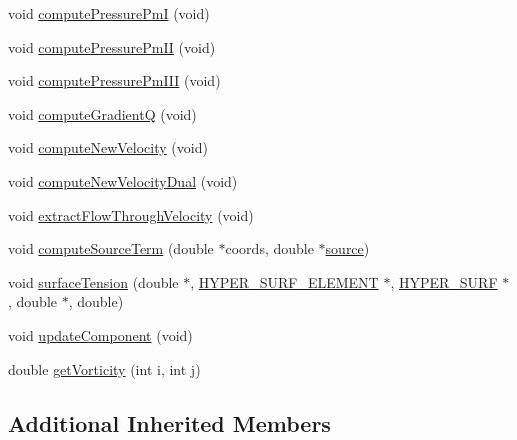 \begin{DoxyCompactItemize}
\item 
void \hyperlink{class_incompress___solver___smooth__2_d___cartesian_a04bcfa9ff475055efdd14795bcce3e73}{compute\+Pressure\+PmI} (void)
\item 
void \hyperlink{class_incompress___solver___smooth__2_d___cartesian_af03081a584deae75a714276f903125fd}{compute\+Pressure\+Pm\+II} (void)
\item 
void \hyperlink{class_incompress___solver___smooth__2_d___cartesian_aa75bb3c60a17765d019d1626ca0c12f2}{compute\+Pressure\+Pm\+I\+II} (void)
\item 
void \hyperlink{class_incompress___solver___smooth__2_d___cartesian_a41402e490b20e941a64a0af7dc90ea50}{compute\+GradientQ} (void)
\item 
void \hyperlink{class_incompress___solver___smooth__2_d___cartesian_a817e87aba7538a34d37ca48f04f4bf51}{compute\+New\+Velocity} (void)
\item 
void \hyperlink{class_incompress___solver___smooth__2_d___cartesian_a32f7330c03564f84dfbb9d603e1b930a}{compute\+New\+Velocity\+Dual} (void)
\item 
void \hyperlink{class_incompress___solver___smooth__2_d___cartesian_a273170b0f8040fe6528c93a81233238d}{extract\+Flow\+Through\+Velocity} (void)
\item 
void \hyperlink{class_incompress___solver___smooth__2_d___cartesian_a63e4680fa5d2b43239e1eb59df4e3382}{compute\+Source\+Term} (double $\ast$coords, double $\ast$\hyperlink{class_incompress___solver___smooth___basis_ab571615b4743bbd36e8eea358f7a7eed}{source})
\item 
void \hyperlink{class_incompress___solver___smooth__2_d___cartesian_a31f1c4db324c6c03fa348268a309d6bf}{surface\+Tension} (double $\ast$, \hyperlink{int_8h_a17e21ae7174174d7a55516f8c9a8f12f}{H\+Y\+P\+E\+R\+\_\+\+S\+U\+R\+F\+\_\+\+E\+L\+E\+M\+E\+NT} $\ast$, \hyperlink{int_8h_acef50fa4757ce0d3f75c97fab5a175bc}{H\+Y\+P\+E\+R\+\_\+\+S\+U\+RF} $\ast$, double $\ast$, double)
\item 
void \hyperlink{class_incompress___solver___smooth__2_d___cartesian_adae5dfa6d17c50994707b0482b5862b1}{update\+Component} (void)
\item 
double \hyperlink{class_incompress___solver___smooth__2_d___cartesian_af85c768ce873275c49c8a8b82f8d8941}{get\+Vorticity} (int i, int j)
\end{DoxyCompactItemize}
\subsection*{Additional Inherited Members}


